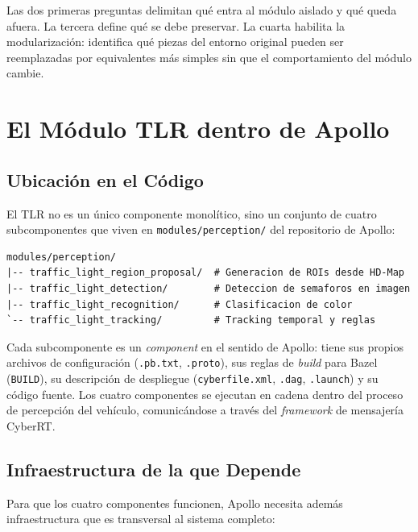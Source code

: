 Las dos primeras preguntas delimitan qué entra al módulo aislado y qué queda afuera. La tercera define qué se debe preservar. La cuarta habilita la modularización: identifica qué piezas del entorno original pueden ser reemplazadas por equivalentes más simples sin que el comportamiento del módulo cambie.

\section{El Módulo TLR dentro de Apollo}

\subsection{Ubicación en el Código}

El TLR no es un único componente monolítico, sino un conjunto de cuatro subcomponentes que viven en \texttt{modules/perception/} del repositorio de Apollo:

\begin{verbatim}
modules/perception/
|-- traffic_light_region_proposal/  # Generacion de ROIs desde HD-Map
|-- traffic_light_detection/        # Deteccion de semaforos en imagen
|-- traffic_light_recognition/      # Clasificacion de color
`-- traffic_light_tracking/         # Tracking temporal y reglas
\end{verbatim}

Cada subcomponente es un \textit{component} en el sentido de Apollo: tiene sus propios archivos de configuración (\texttt{.pb.txt}, \texttt{.proto}), sus reglas de \textit{build} para Bazel (\texttt{BUILD}), su descripción de despliegue (\texttt{cyberfile.xml}, \texttt{.dag}, \texttt{.launch}) y su código fuente. Los cuatro componentes se ejecutan en cadena dentro del proceso de percepción del vehículo, comunicándose a través del \textit{framework} de mensajería CyberRT.

\subsection{Infraestructura de la que Depende}

Para que los cuatro componentes funcionen, Apollo necesita además infraestructura que es transversal al sistema completo:

